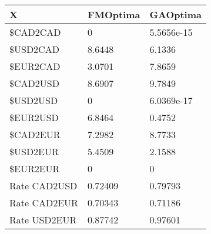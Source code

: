 \begin{tabular}{lll}
X & FMOptima & GAOptima \\ 
\hline 
\$CAD2CAD & 0 & 5.5656e-15 \\ 
\$USD2CAD & 8.6448 & 6.1336 \\ 
\$EUR2CAD & 3.0701 & 7.8659 \\ 
\$CAD2USD & 8.6907 & 9.7849 \\ 
\$USD2USD & 0 & 6.0369e-17 \\ 
\$EUR2USD & 6.8464 & 0.4752 \\ 
\$CAD2EUR & 7.2982 & 8.7733 \\ 
\$USD2EUR & 5.4509 & 2.1588 \\ 
\$EUR2EUR & 0 & 0 \\ 
Rate CAD2USD & 0.72409 & 0.79793 \\ 
Rate CAD2EUR & 0.70343 & 0.71186 \\ 
Rate USD2EUR & 0.87742 & 0.97601 \\ 
\hline 
\end{tabular}